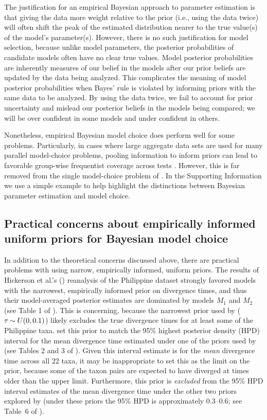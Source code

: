The justification for an empirical Bayesian approach to parameter estimation is
that giving the data more weight relative to the prior (i.e., using the data
twice) will often shift the peak of the estimated distribution nearer to the
true value(s) of the model's parameter(s).
However, there is no such justification for model selection, because unlike
model parameters, the posterior probabilities of candidate models often have no
clear true values.
Model posterior probabilities are inherently measures of our belief in the
models after our prior beliefs are updated by the data being analyzed.
This complicates the meaning of model posterior probabilities when Bayes' rule
is violated by informing priors with the same data to be analyzed.
By using the data twice, we fail to account for prior uncertainty and mislead
our posterior beliefs in the models being compared; we will be over confident
in some models and under confident in others.

Nonetheless, empirical Bayesian model choice does perform well for some
problems.
Particularly, in cases where large aggregate data sets are used for many
parallel model-choice problems, pooling information to inform
priors can lead to favorable group-wise frequentist coverage across tests
\citep{Efron2008}.
However, this is far removed from the single model-choice problem of \msb.
In the Supporting Information we use a simple example to help highlight the
distinctions between Bayesian parameter estimation and model choice.

\subsection{Practical concerns about empirically informed uniform priors for
    Bayesian model choice}
In addition to the theoretical concerns discussed above, there are practical
problems with using narrow, empirically informed, uniform priors.
The results of Hickerson et al.'s (\citeyear{Hickerson2013}) reanalysis of the
Philippine dataset strongly favored models with the narrowest, empirically
informed prior on divergence times, and thus their model-averaged posterior
estimates are dominated by models $M_1$ and $M_2$ (see Table 1 of
\citet{Hickerson2013}).
This is concerning, because the narrowest \divt{} prior used by
\citet{Hickerson2013} ($\tau_{} \sim U(0,0.1)$) likely excludes the true
divergence times for at least some of the Philippine taxa.
\citet{Hickerson2013} set this prior to match the 95\% highest posterior
density (HPD) interval for the mean divergence time estimated under one of the
priors used by \citet{Oaks2012} (see Tables 2 and 3 of \citet{Oaks2012}).
Given this interval estimate is for the \emph{mean} divergence time across all
22 taxa, it may be inappropriate to set this as the limit on the prior, because
some of the taxon pairs are expected to have diverged at times older than the
upper limit.
Furthermore, this prior is \emph{excluded} from the 95\% HPD interval estimates
of the mean divergence time under the other two priors explored by
\citet{Oaks2012} (under these priors the 95\% HPD is approximately 0.3--0.6;
see Table~6 of \citet{Oaks2012}).

